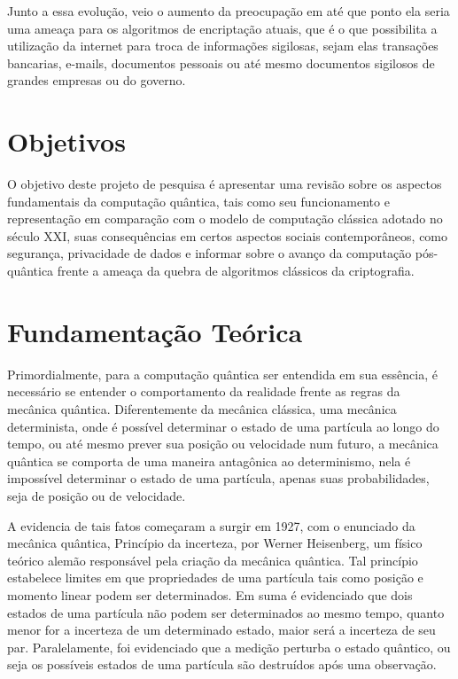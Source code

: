 \documentclass[
	12pt,				%
	oneside,			%
	a4paper,			%
	english,			%
	french,				%
	spanish,			%
	brazil,				%
	]{abntex2}
\begin{document}
Junto a essa evolução, veio o aumento da preocupação em até que ponto ela seria uma ameaça para os algoritmos de encriptação atuais, que é o que possibilita a utilização da internet para troca de informações sigilosas, sejam elas transações bancarias, e-mails, documentos pessoais ou até mesmo documentos sigilosos de grandes empresas ou do governo.

\chapter{Objetivos}

O objetivo deste projeto de pesquisa é apresentar uma revisão sobre os aspectos fundamentais da computação quântica, tais como seu funcionamento e representação em comparação com o modelo de computação clássica adotado no século XXI, suas consequências em certos aspectos sociais contemporâneos, como segurança, privacidade de dados e informar sobre o avanço da computação pós-quântica frente a ameaça da quebra de algoritmos clássicos da criptografia. 

\chapter{Fundamentação Teórica}

Primordialmente, para a computação quântica ser entendida em sua essência, é necessário se entender o comportamento da realidade frente as regras da mecânica quântica. Diferentemente da mecânica clássica, uma mecânica determinista, onde é possível determinar o estado de uma partícula ao longo do tempo, ou até mesmo prever sua posição ou velocidade num futuro, a mecânica quântica se comporta de uma maneira antagônica ao determinismo, nela é impossível determinar o estado de uma partícula, apenas suas probabilidades, seja de posição ou de velocidade.

A evidencia de tais fatos começaram a surgir em 1927, com o enunciado da mecânica quântica, Princípio da incerteza, por Werner Heisenberg, um físico teórico alemão responsável pela criação da mecânica quântica. Tal princípio estabelece limites em que propriedades de uma partícula tais como posição e momento linear podem ser determinados. Em suma é evidenciado que dois estados de uma partícula não podem ser determinados ao mesmo tempo, quanto menor for a incerteza de um determinado estado, maior será a incerteza de seu par. Paralelamente, foi evidenciado que a medição perturba o estado quântico, ou seja os possíveis estados de uma partícula são destruídos após uma observação.
\end{document}
